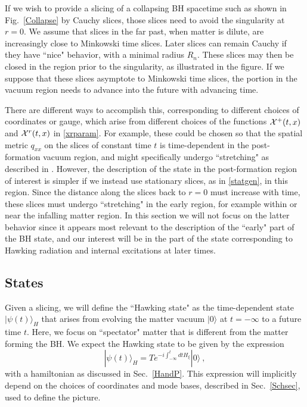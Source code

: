 \documentclass[12pt]{article}
\numberwithin{equation}{section}
\newcommand{\beq}{\begin{equation}}
\newcommand{\eeq}{\end{equation}}
\begin{document}
If we wish to provide a slicing of a collapsing BH spacetime such as shown in Fig.~\ref{Collapse} by Cauchy slices, those slices need to avoid the singularity at $r=0$.  
We assume that slices in the far past, when matter is dilute, are increasingly close to Minkowski time slices.  Later slices can remain Cauchy
 if they have ``nice" behavior, with a minimal radius $R_n$. These slices may then be closed in the region prior to the singularity, as illustrated in the figure.  If we suppose that these slices asymptote to Minkowski time slices, the portion in the vacuum region needs to advance  into the future with advancing time.  




There are different ways to accomplish this, corresponding to different choices of coordinates or gauge, which arise from different choices of the functions ${\cal X}^+(t,x)$ and ${\cal X}^r(t,x)$ in \eqref{xrparam}.  For example, these could be chosen so that the spatial metric $q_{xx}$ on the slices of constant time $t$ is time-dependent in the post-formation vacuum region, and might specifically undergo ``stretching" as described in \cite{Mathinforev}.  However, the description of the state in the post-formation region of interest is simpler if we instead use stationary slices, as in \eqref{statgen}, in this region.  Since the distance along the slices back to $r=0$ must increase with time, these slices must undergo ``stretching" in the early region, for example within or near the infalling matter region.  In this section we will not focus on the latter behavior since it appears most relevant to the description of the ``early" part of the BH state, and our interest will be in the part of the state corresponding to Hawking radiation and internal excitations at later times.

\subsection{States}

Given a slicing, we will define the ``Hawking state" as the time-dependent state $|\psi(t)\rangle_H$ that arises from evolving the matter vacuum $|0\rangle$ at $t=-\infty$ to a future time $t$.  Here, we focus on ``spectator" matter that is different from the matter forming the BH.  We expect the Hawking state to be given by the expression
\beq\label{Hevol}
|\psi(t)\rangle_H = T e^{ -i \int_{-\infty}^tdt H_\xi}|0\rangle\ ,
\eeq
with a hamiltonian as discussed in Sec.~\ref{HandP}.  This expression will implicitly depend on the choices of coordinates and mode bases, described in Sec.~\ref{Schsec}, used to define the picture.
\end{document}
